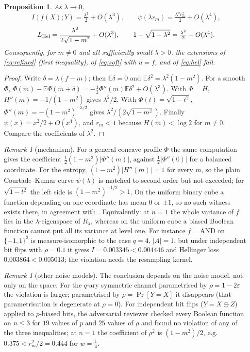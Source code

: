 \documentclass[11pt]{amsart}
\newtheorem{proposition}[theorem]{Proposition}
\theoremstyle{remark}
\newtheorem{remark}[theorem]{Remark}
\newcommand{\E}{\mathbb E}
\begin{document}
\begin{proposition}\label{prop:main}
As $\lambda\to0$,
\[
I(f(X);Y)=\tfrac{\lambda^2}{2}+O(\lambda^3),\qquad
\psi(\lambda r_m)=\tfrac{\lambda^2r_m^2}{2}+O(\lambda^4),
\]
\[
L_{\rm Hel}=\frac{\lambda^2}{2\sqrt{1-m^2}}+O(\lambda^3),\qquad
1-\sqrt{1-\lambda^2}=\tfrac{\lambda^2}{2}+O(\lambda^4).
\]
Consequently, for $m\ne0$ and all sufficiently small $\lambda>0$, the extensions of
\eqref{eq:refined} (first inequality), of \eqref{eq:soft} with $u=f$, and of \eqref{eq:hel} fail.
\end{proposition}
\begin{proof}
Write $\delta=\lambda(f-m)$; then $\E\delta=0$ and $\E\delta^2=\lambda^2(1-m^2)$. For a smooth
$\Phi$, $\Phi(m)-\E\Phi(m+\delta)=-\tfrac12\Phi''(m)\E\delta^2+O(\lambda^3)$. With
$\Phi=H$, $H''(m)=-1/(1-m^2)$ gives $\lambda^2/2$. With $\Phi(t)=\sqrt{1-t^2}$,
$\Phi''(m)=-(1-m^2)^{-3/2}$ gives $\lambda^2/(2\sqrt{1-m^2})$. Finally $\psi(x)=x^2/2+O(x^4)$, and
$r_m<1$ because $H(m)<\log2$ for $m\ne0$. Compare the coefficients of $\lambda^2$.
\end{proof}

\begin{remark}[mechanism]
For a general concave profile $\Phi$ the same computation gives the coefficient
$\tfrac12(1-m^2)|\Phi''(m)|$, against $\tfrac12|\Phi''(0)|$ for a balanced coordinate. For the
entropy, $(1-m^2)|H''(m)|=1$ for every $m$, so the plain Courtade--Kumar curve $\psi(\lambda)$ is
matched to second order but not exceeded; for $\sqrt{1-t^2}$ the left side is
$(1-m^2)^{-1/2}>1$. On the uniform binary cube a function depending on one coordinate has mean
$0$ or $\pm1$, so no such witness exists there, in agreement with \cite{oai-ck,oai-hel}.
Equivalently: at $n=1$ the whole variance of $f$ lies in the $\lambda$-eigenspace of $R_\lambda$,
whereas on the uniform cube a biased Boolean function cannot put all its variance at level one.
For instance $f=\mathrm{AND}$ on $\{-1,1\}^2$ is measure-isomorphic to the case $q=4$, $|A|=1$,
but under independent bit flips with $\rho=0.1$ it gives $I=0.003345<0.004446$ and Hellinger loss
$0.003864<0.005013$; the violation needs the resampling kernel.
\end{remark}

\begin{remark}[other noise models]
The conclusion depends on the noise model, not only on the space. For the $q$-ary symmetric channel
parametrised by $\rho=1-2\varepsilon$ the violation is larger; parametrised by $\rho=\Pr[Y=X]$ it
disappears (that parametrisation is degenerate at $\rho=0$). For independent bit flips
($Y=X\oplus Z$) applied to $p$-biased bits, the adversarial reviewer checked every Boolean function on
$n\le3$ for $19$ values of $p$ and $25$ values of $\rho$ and found no violation of any of the three
inequalities; at $n=1$ the coefficient of $\rho^2$ is $(1-m^2)/2$, e.g.\ $0.375<r_m^2/2=0.444$ for $w=\tfrac14$.
\end{remark}
\end{document}

